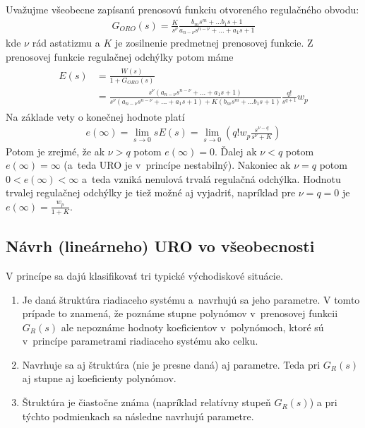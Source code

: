 \documentclass[a4paper, 10pt, ]{article}
\begin{document}
Uvažujme všeobecne zapísanú prenosovú funkciu otvoreného regulačného obvodu:
\begin{align}
    G_{ORO}(s) = \frac{K}{s^\nu} \frac{b_m s^m + \ldots b_1 s + 1}{a_{n-\nu}s^{n-\nu} + \ldots + a_1s + 1}
\end{align}
kde $\nu$ rád astatizmu a $K$ je zosilnenie predmetnej prenosovej funkcie. Z prenosovej funkcie  regulačnej odchýlky potom máme
\begin{align}
\begin{aligned}
    E(s) &= \frac{W(s)}{1 + G_{ORO}(s)}
    \\&= \frac{s^\nu \left( a_{n-\nu}s^{n-\nu} + \ldots + a_1s + 1 \right)}{s^\nu \left( a_{n-\nu}s^{n-\nu} + \ldots + a_1s + 1 \right) + K \left( b_m s^m + \ldots b_1 s + 1 \right)}
    \frac{q!}{s^{q+1}}w_p
\end{aligned}
\end{align}
Na základe vety o konečnej hodnote platí
\begin{align}
    e(\infty) = \lim_{s\to 0} s E(s) =  \lim_{s\to 0} \left( q! w_p \frac{s^{\nu-q}}{s^\nu + K} \right)
\end{align}
Potom je zrejmé, že ak $\nu > q$ potom $e(\infty) = 0$. Ďalej ak $\nu < q$ potom $e(\infty) = \infty$ (a~teda URO je v~princípe nestabilný). Nakoniec ak $\nu = q$ potom $ 0 < e(\infty) < \infty$ a~teda vzniká nenulová trvalá regulačná odchýlka. Hodnotu trvalej regulačnej odchýlky je tiež možné aj vyjadriť, napríklad pre $\nu = q = 0$ je $e(\infty) = \frac{w_p}{1 + K}$.








\subsection{Návrh (lineárneho) URO vo všeobecnosti}

V princípe sa dajú klasifikovať tri typické východiskové situácie.

\begin{enumerate}[leftmargin=0pt, labelsep=4mm, itemsep=0pt]
    \item Je daná štruktúra riadiaceho systému a~navrhujú sa jeho parametre. \newline V tomto prípade to znamená, že poznáme stupne polynómov v~prenosovej funkcii $G_R(s)$ ale nepoznáme hodnoty koeficientov v~polynómoch, ktoré sú v~princípe parametrami riadiaceho systému ako celku.

    \item Navrhuje sa aj štruktúra (nie je presne daná) aj parametre. \newline Teda pri $G_R(s)$ aj stupne aj koeficienty polynómov.

    \item Štruktúra je čiastočne známa (napríklad relatívny stupeň $G_R(s)$) a pri týchto podmienkach sa následne navrhujú parametre.

\end{enumerate}
\end{document}
